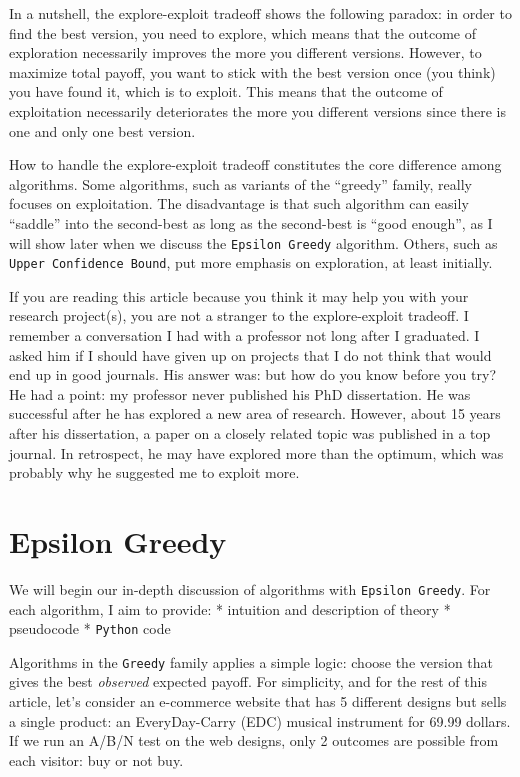 \documentclass[
]{book}
\theoremstyle{definition}
\theoremstyle{definition}
\theoremstyle{definition}
\theoremstyle{definition}
\theoremstyle{remark}
\begin{document}
In a nutshell, the explore-exploit tradeoff shows the following paradox: in order to find the best version, you need to explore, which means that the outcome of exploration necessarily improves the more you different versions. However, to maximize total payoff, you want to stick with the best version once (you think) you have found it, which is to exploit. This means that the outcome of exploitation necessarily deteriorates the more you different versions since there is one and only one best version.

How to handle the explore-exploit tradeoff constitutes the core difference among algorithms. Some algorithms, such as variants of the ``greedy'' family, really focuses on exploitation. The disadvantage is that such algorithm can easily ``saddle'' into the second-best as long as the second-best is ``good enough'', as I will show later when we discuss the \texttt{Epsilon\ Greedy} algorithm. Others, such as \texttt{Upper\ Confidence\ Bound}, put more emphasis on exploration, at least initially.

If you are reading this article because you think it may help you with your research project(s), you are not a stranger to the explore-exploit tradeoff. I remember a conversation I had with a professor not long after I graduated. I asked him if I should have given up on projects that I do not think that would end up in good journals. His answer was: but how do you know before you try? He had a point: my professor never published his PhD dissertation. He was successful after he has explored a new area of research. However, about 15 years after his dissertation, a paper on a closely related topic was published in a top journal. In retrospect, he may have explored more than the optimum, which was probably why he suggested me to exploit more.

\hypertarget{epsilon-greedy}{%
\section{Epsilon Greedy}\label{epsilon-greedy}}

We will begin our in-depth discussion of algorithms with \texttt{Epsilon\ Greedy}. For each algorithm, I aim to provide:
* intuition and description of theory
* pseudocode
* \texttt{Python} code

Algorithms in the \texttt{Greedy} family applies a simple logic: choose the version that gives the best \emph{observed} expected payoff. For simplicity, and for the rest of this article, let's consider an e-commerce website that has 5 different designs but sells a single product: an EveryDay-Carry (EDC) musical instrument for 69.99 dollars. If we run an A/B/N test on the web designs, only 2 outcomes are possible from each visitor: buy or not buy.
\end{document}
